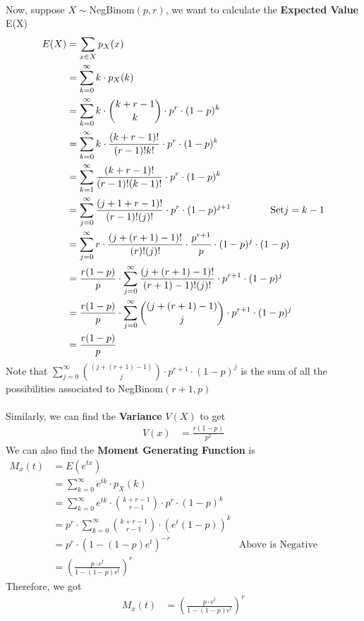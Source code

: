 \documentclass[11pt,oneside]{book}
\theoremstyle{break}
\theoremstyle{break}
\begin{document}
\hfill\\
Now, suppose $X\sim $NegBinom$(p,r)$, we want to calculate the \textbf{Expected Value} E(X)\begin{align*}
E(X)&=\sum_{x\in X}p_X(x)\\
&=\sum_{k=0}^{\infty}k\cdot p_X(k)\\
&=\sum_{k=0}^{\infty}k\cdot \binom{k+r-1}{k} \cdot p^r\cdot (1-p)^k\\
&=\sum_{k=0}^{\infty}k\cdot \frac{(k+r-1)!}{(r-1)!k!} \cdot p^r\cdot (1-p)^k\\
&=\sum_{k=1}^{\infty} \frac{(k+r-1)!}{(r-1)!(k-1)!} \cdot p^r\cdot (1-p)^k\\
&=\sum_{j=0}^{\infty} \frac{(j+1+r-1)!}{(r-1)!(j)!} \cdot p^r\cdot (1-p)^{j+1} \text{\qquad \qquad Set} j=k-1\\
&=\sum_{j=0}^{\infty} r\cdot \frac{(j+(r+1)-1)!}{(r)!(j)!} \cdot \frac{p^{r+1}}{p}\cdot (1-p)^{j}\cdot (1-p)\\
&=\frac{r(1-p)}{p}\cdot \sum_{j=0}^{\infty} \frac{(j+(r+1)-1)!}{(r+1)-1)!(j)!} \cdot p^{r+1}\cdot (1-p)^{j}\\
&=\frac{r(1-p)}{p}\cdot \sum_{j=0}^{\infty} \binom{(j+(r+1)-1)}{j}\cdot p^{r+1}\cdot (1-p)^{j}\\
&=\frac{r(1-p)}{p}
\end{align*}
Note that $\sum_{j=0}^{\infty} \binom{(j+(r+1)-1)}{j}\cdot p^{r+1}\cdot (1-p)^{j}$ is the sum of all the possibilities associated to NegBinom$(r+1,p)$\\
\hfill\\
Similarly, we can find the \textbf{Variance} $V(X)$ to get \begin{align*}
V(x)&=\frac{r(1-p)}{p^2}
\end{align*}
We can also find the \textbf{Moment Generating Function} is\begin{align*}
M_x(t)&=E(e^{tx})\\
&=\sum_{k=0}^{\infty}e^{tk}\cdot p_X(k)\\
&=\sum_{k=0}^{\infty}e^{tk}\cdot \binom{k+r-1}{r-1} \cdot p^r\cdot (1-p)^k\\
&=p^r\cdot \sum_{k=0}^{\infty}\binom{k+r-1}{r-1} \cdot	 (e^t(1-p))^k\\
&=p^r\cdot (1-(1-p)e^t)^{-r}&\text{Above is Negative Binomial Series}\\
&=\left( \frac{p\cdot e^t}{1-(1-p)e^t}\right)^r
\end{align*}
Therefore, we got
 \begin{align*}
M_x(t)&=\left( \frac{p\cdot e^t}{1-(1-p)e^t}\right)^r
\end{align*}
\newpage
\end{document}
